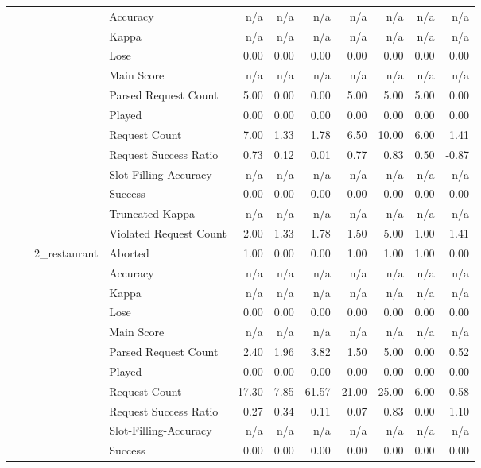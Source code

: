 \begin{tabular}{llllrrrrrrr}
 &  &  & Accuracy & n/a & n/a & n/a & n/a & n/a & n/a & n/a \\
 &  &  & Kappa & n/a & n/a & n/a & n/a & n/a & n/a & n/a \\
 &  &  & Lose & 0.00 & 0.00 & 0.00 & 0.00 & 0.00 & 0.00 & 0.00 \\
 &  &  & Main Score & n/a & n/a & n/a & n/a & n/a & n/a & n/a \\
 &  &  & Parsed Request Count & 5.00 & 0.00 & 0.00 & 5.00 & 5.00 & 5.00 & 0.00 \\
 &  &  & Played & 0.00 & 0.00 & 0.00 & 0.00 & 0.00 & 0.00 & 0.00 \\
 &  &  & Request Count & 7.00 & 1.33 & 1.78 & 6.50 & 10.00 & 6.00 & 1.41 \\
 &  &  & Request Success Ratio & 0.73 & 0.12 & 0.01 & 0.77 & 0.83 & 0.50 & -0.87 \\
 &  &  & Slot-Filling-Accuracy & n/a & n/a & n/a & n/a & n/a & n/a & n/a \\
 &  &  & Success & 0.00 & 0.00 & 0.00 & 0.00 & 0.00 & 0.00 & 0.00 \\
 &  &  & Truncated Kappa & n/a & n/a & n/a & n/a & n/a & n/a & n/a \\
 &  &  & Violated Request Count & 2.00 & 1.33 & 1.78 & 1.50 & 5.00 & 1.00 & 1.41 \\
\cline{3-11}
 &  & \multirow[t]{13}{*}{2_restaurant} & Aborted & 1.00 & 0.00 & 0.00 & 1.00 & 1.00 & 1.00 & 0.00 \\
 &  &  & Accuracy & n/a & n/a & n/a & n/a & n/a & n/a & n/a \\
 &  &  & Kappa & n/a & n/a & n/a & n/a & n/a & n/a & n/a \\
 &  &  & Lose & 0.00 & 0.00 & 0.00 & 0.00 & 0.00 & 0.00 & 0.00 \\
 &  &  & Main Score & n/a & n/a & n/a & n/a & n/a & n/a & n/a \\
 &  &  & Parsed Request Count & 2.40 & 1.96 & 3.82 & 1.50 & 5.00 & 0.00 & 0.52 \\
 &  &  & Played & 0.00 & 0.00 & 0.00 & 0.00 & 0.00 & 0.00 & 0.00 \\
 &  &  & Request Count & 17.30 & 7.85 & 61.57 & 21.00 & 25.00 & 6.00 & -0.58 \\
 &  &  & Request Success Ratio & 0.27 & 0.34 & 0.11 & 0.07 & 0.83 & 0.00 & 1.10 \\
 &  &  & Slot-Filling-Accuracy & n/a & n/a & n/a & n/a & n/a & n/a & n/a \\
 &  &  & Success & 0.00 & 0.00 & 0.00 & 0.00 & 0.00 & 0.00 & 0.00 \\

\end{tabular}
